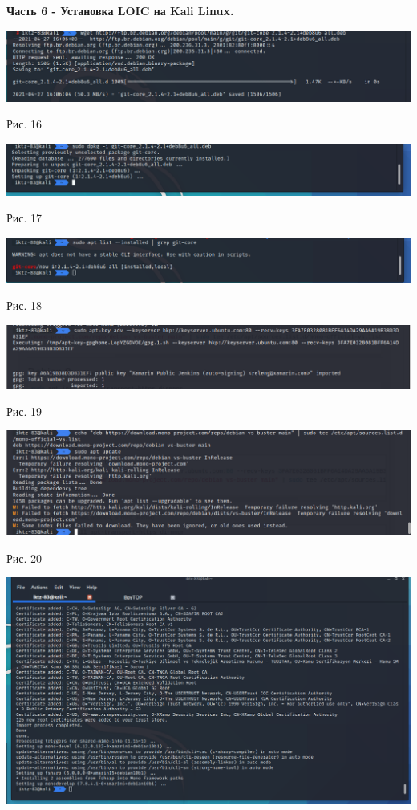 \documentclass[a4paper,14pt]{extarticle}
\begin{document}
   \textbf{Часть 6 - Установка LOIC на Kali Linux.}
   \begin{center}
        \includegraphics[scale=0.45]{pics/16.png}

        Рис. 16 

        \includegraphics[scale=0.45]{pics/17.png}

        Рис. 17 

        \includegraphics[scale=0.45]{pics/18.png}

        Рис. 18 

        \includegraphics[scale=0.45]{pics/19.png}

        Рис. 19 

        \includegraphics[scale=0.45]{pics/20.png}

        Рис. 20 

        \includegraphics[scale=0.4]{pics/21.png}


\end{center}
\end{document}
